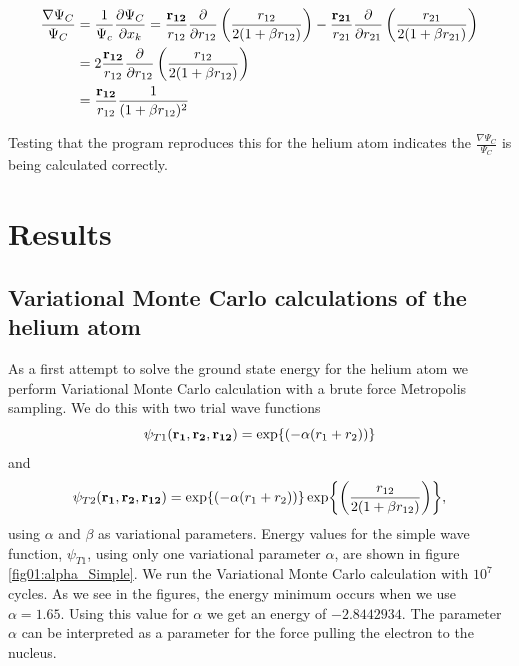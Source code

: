 \documentclass[11pt]{article}
\begin{document}
			\begin{align}
				\frac{\nabla\Psi_C}{\Psi_C} &= \frac{1}{\Psi_c} \pdv{\Psi_C}{x_k} = \frac{\vb{r_{12}}}{r_{12}}\pdv{}{r_{12}}\left( \frac{r_{12}}{2(1+\beta r_{12})} \right) - \frac{\vb{r_{21}}}{r_{21}}\pdv{}{r_{21}}\left( \frac{r_{21}}{2(1+\beta r_{21})} \right)
				\\
				&= 2\frac{\vb{r_{12}}}{r_{12}}\pdv{}{r_{12}}\left( \frac{r_{12}}{2(1+\beta r_{12})} \right)
				\\
				&= \frac{\vb{r_{12}}}{r_{12}} \frac{1}{(1+\beta r_{12})^2}
			\end{align}

			Testing that the program reproduces this for the helium atom indicates the \(\frac{\nabla \Psi_C}{\Psi_C}\) is being calculated correctly.

\section{Results}
	\subsection{Variational Monte Carlo calculations of the helium
atom}
		As a first attempt to solve the ground state energy for the helium
		atom we perform Variational Monte Carlo calculation with a brute force
		Metropolis sampling. We do this with two trial wave functions
		\[
		\psi_{T1}({\bf r_{1}},{\bf r_{2}},{\bf r_{12}})=\exp{\left(-\alpha(r_{1}+r_{2})\right)}
		\]
		and
		\[
		\psi_{T2}({\bf r_{1}},{\bf r_{2}},{\bf r_{12}})=\exp{\left(-\alpha(r_{1}+r_{2})\right)}\exp{\left(\frac{r_{12}}{2(1+\beta r_{12})}\right)},
		\]
		using $\alpha$ and $\beta$ as variational parameters. Energy values
		for the simple wave function, $\psi_{T1}$, using only one variational
		parameter $\alpha$, are shown in figure \ref{fig01:alpha_Simple}.
		We run the Variational Monte Carlo calculation with $10^{7}$ cycles.
		As we see in the figures, the energy minimum occurs when we use $\alpha=1.65$.
		Using this value for $\alpha$ we get an energy of $-2.8442934$.
		The parameter $\alpha$ can be interpreted as a parameter for the
		force pulling the electron to the nucleus.
\end{document}
